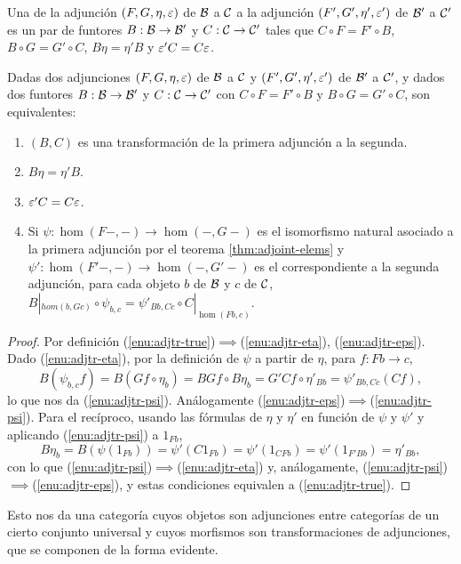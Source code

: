 \begin{definition}
  Una  de la adjunción $(F,G,\eta,\varepsilon)$ de
  $\mathcal{B}$ a $\mathcal{C}$ a la adjunción $(F',G',\eta',\varepsilon')$ de $\mathcal{B}'$ a $\mathcal{C}'$ es un
  par de funtores $B:\mathcal{B}\to\mathcal{B}'$ y $C:\mathcal{C}\to\mathcal{C}'$ tales que $C\circ F=F'\circ B$,
  $B\circ G=G'\circ C$, $B\eta=\eta'B$ y $\varepsilon'C=C\varepsilon$.
\end{definition}

\begin{proposition}\label{prop:adj-transform}
  Dadas dos adjunciones $(F,G,\eta,\varepsilon)$ de $\mathcal{B}$ a $\mathcal{C}$ y
  $(F',G',\eta',\varepsilon')$ de $\mathcal{B}'$ a $\mathcal{C}'$, y dados dos funtores $B:\mathcal{B}\to\mathcal{B}'$
  y $C:\mathcal{C}\to\mathcal{C}'$ con $C\circ F=F'\circ B$ y $B\circ G=G'\circ C$, son
  equivalentes:
  \begin{enumerate}
  \item \label{enu:adjtr-true} $(B,C)$ es una transformación de la primera
    adjunción a la segunda.
  \item \label{enu:adjtr-eta} $B\eta=\eta'B$.
  \item \label{enu:adjtr-eps} $\varepsilon'C=C\varepsilon$.
  \item \label{enu:adjtr-psi} Si $\psi:\hom(F-,-)\to\hom(-,G-)$ es el
    isomorfismo natural asociado a la primera adjunción por el teorema
    \ref{thm:adjoint-elems} y $\psi':\hom(F'-,-)\to\hom(-,G'-)$ es el
    correspondiente a la segunda adjunción, para cada objeto $b$ de $\mathcal{B}$ y $c$
    de $\mathcal{C}$,
    $B|_{hom(b,Gc)}\circ\psi_{b,c}=\psi'_{Bb,Cc}\circ C|_{\hom(Fb,c)}$.
  \end{enumerate}
\end{proposition}
\begin{proof}
  Por definición
  (\ref{enu:adjtr-true})$\implies$(\ref{enu:adjtr-eta}), (\ref{enu:adjtr-eps}). Dado
  (\ref{enu:adjtr-eta}), por la definición de $\psi$ a partir de $\eta$, para
  $f:Fb\to c$,
  \[
    B(\psi_{b,c}f) = B(Gf\circ\eta_b) = BGf\circ B\eta_b = G'Cf\circ\eta'_{Bb}
    = \psi'_{Bb,Cc}(Cf),
  \]
  lo que nos da (\ref{enu:adjtr-psi}). Análogamente
  (\ref{enu:adjtr-eps})$\implies$(\ref{enu:adjtr-psi}). Para el recíproco,
  usando las fórmulas de $\eta$ y $\eta'$ en función de $\psi$ y $\psi'$ y
  aplicando (\ref{enu:adjtr-psi}) a $1_{Fb}$,
  \[
    B\eta_b = B(\psi(1_{Fb})) = \psi'(C1_{Fb}) = \psi'(1_{CFb}) =
    \psi'(1_{F'Bb}) = \eta'_{Bb},
  \]
  con lo que (\ref{enu:adjtr-psi})$\implies$(\ref{enu:adjtr-eta}) y,
  análogamente, (\ref{enu:adjtr-psi})$\implies$(\ref{enu:adjtr-eps}), y estas
  condiciones equivalen a (\ref{enu:adjtr-true}).
\end{proof}

Esto nos da una categoría cuyos objetos son adjunciones entre categorías de un
cierto conjunto universal y cuyos morfismos son transformaciones de adjunciones,
que se componen de la forma evidente.

